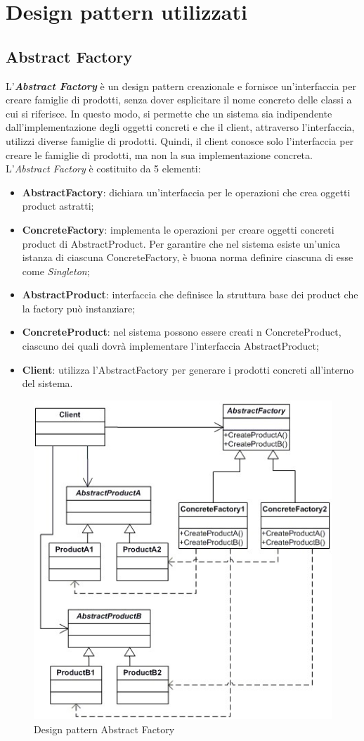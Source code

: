 \newpage
\section{Design pattern utilizzati}


\subsection{Abstract Factory}
L'\textbf{\textit{Abstract Factory}} è un design pattern creazionale e fornisce un'interfaccia per creare famiglie di prodotti, senza dover esplicitare il nome concreto delle classi a cui si riferisce. In questo modo, si permette che un sistema sia indipendente dall'implementazione degli oggetti concreti e che il client, attraverso l'interfaccia, utilizzi diverse famiglie di prodotti. Quindi, il client conosce solo l’interfaccia per creare le famiglie di prodotti, ma non la sua implementazione concreta.
L’\textit{Abstract Factory} è costituito da 5 elementi:
\begin{itemize}
	\item \textbf{AbstractFactory}: dichiara un'interfaccia per le operazioni che crea oggetti product astratti;
	\item \textbf{ConcreteFactory}: implementa le operazioni per creare oggetti concreti product di AbstractProduct. Per garantire che nel sistema esiste un’unica istanza di ciascuna ConcreteFactory, è buona norma definire ciascuna di esse come \textit{Singleton};
	\item \textbf{AbstractProduct}: interfaccia che definisce la struttura base dei product che la factory può instanziare;
	\item \textbf{ConcreteProduct}: nel sistema possono essere creati n ConcreteProduct, ciascuno dei quali dovrà implementare l’interfaccia AbstractProduct;
	\item \textbf{Client}: utilizza l’AbstractFactory per generare i prodotti concreti all’interno del sistema.
\end{itemize}

\begin{figure}[H]
	\centering
	\includegraphics[width=0.5\linewidth]{IMG/abstract-pattern}
	\caption{Design pattern Abstract Factory}
\end{figure}

